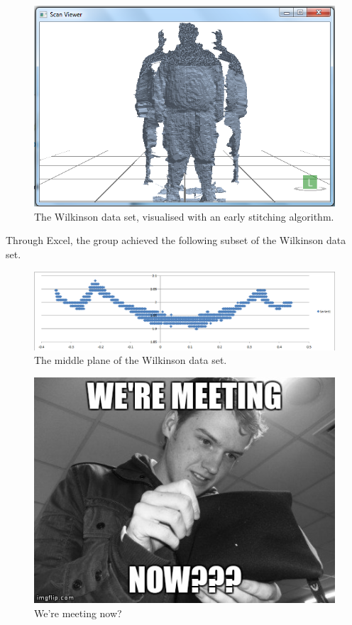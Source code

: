\begin{figure}[h]
\begin{center}
\includegraphics[scale=0.4]{./testing/wilko1} 
\end{center}
\caption{The Wilkinson data set, visualised with an early stitching algorithm.}
\label{fig:the wilkinson data set, visualised with an early stitching algorithm}
\end{figure}

Through Excel, the group achieved the following subset of the Wilkinson data set. 

\begin{figure}[h]
\begin{center}
\includegraphics[scale=0.4]{./testing/wilko2} 
\end{center}
\caption{The middle plane of the Wilkinson data set.}
\label{fig:the middle plane of the Wilkinson data set.}
\end{figure}

\begin{figure}[h]
\begin{center}
\includegraphics[scale=0.4]{./design/nathan} 
\end{center}
\caption{We're meeting now?}
\label{fig:we're meeting now?}
\end{figure}